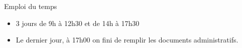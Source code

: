\begin{frame}{Emploi du temps}
  \begin{itemize}
  \item 3 jours de 9h à 12h30 et de 14h à 17h30
  \item Le dernier jour, à 17h00 on fini de remplir les documents administratifs.
  \end{itemize}
\end{frame}
